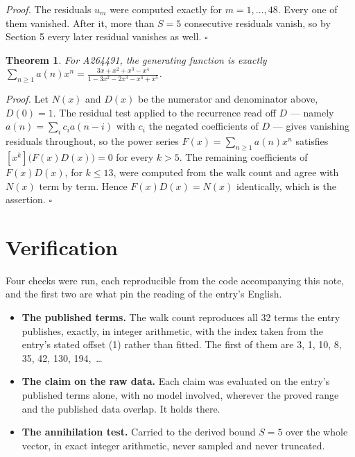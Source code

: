 \documentclass[11pt]{article}
\newtheorem{theorem}{Theorem}
\theoremstyle{definition}
\begin{document}
{\itshape Proof.} The residuals $u_m$ were computed exactly for $m = 1,\dots,48$. Every one of them vanished. After it, more than $S = 5$ consecutive residuals vanish, so by Section 5 every later residual vanishes as well. $\square$

\begin{theorem} For A264491, the generating function is exactly $\sum_{n\ge 1} a(n)x^n = \frac{3x + x^{2} + x^{3} - x^{4}}{1 - 3x^{2} - 2x^{3} - x^{4} + x^{5}}$.\end{theorem}

{\itshape Proof.} Let $N(x)$ and $D(x)$ be the numerator and denominator above, $D(0)=1$. The residual test applied to the recurrence read off $D$ --- namely $a(n) = \sum_i c_i a(n-i)$ with $c_i$ the negated coefficients of $D$ --- gives vanishing residuals throughout, so the power series $F(x)=\sum_{n\ge 1}a(n)x^n$ satisfies $[x^k]\bigl(F(x)D(x)\bigr) = 0$ for every $k > 5$. The remaining coefficients of $F(x)D(x)$, for $k \le 13$, were computed from the walk count and agree with $N(x)$ term by term. Hence $F(x)D(x) = N(x)$ identically, which is the assertion. $\square$

\section{Verification}

Four checks were run, each reproducible from the code accompanying this note, and the first two are what pin the reading of the entry's English.

\begin{itemize}

\item {\bfseries The published terms.} The walk count reproduces all 32 terms the entry publishes, exactly, in integer arithmetic, with the index taken from the entry's stated offset (1) rather than fitted. The first of them are 3, 1, 10, 8, 35, 42, 130, 194,~\dots

\item {\bfseries The claim on the raw data.} Each claim was evaluated on the entry's published terms alone, with no model involved, wherever the proved range and the published data overlap. It holds there.

\item {\bfseries The annihilation test.} Carried to the derived bound $S = 5$ over the whole vector, in exact integer arithmetic, never sampled and never truncated.

\end{itemize}
\end{document}

